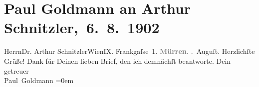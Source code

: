 

         
         \renewcommand{\erwaehntePersonen}{Personen: Paul Goldmann}
         \renewcommand{\erwaehnteOrte}{Orte: Frankgasse 1, Mürren, Wien}
         \renewcommand{\erwaehnteWerke}{}
               \section[ Paul Goldmann an Arthur Schnitzler, 6. 8. 1902]{ Paul Goldmann an Arthur Schnitzler, 6. 8. 1902}\nopagebreak{}\rehead{ }\begin{ledgroupsized}[t]{13cm}\normalsize\beginnumbering \toendnotes[C]{\smallbreak\pagebreak[2]} 
\pstart{}{\pb}Herrn\pend{}\pstart{}Dr. Arthur Schnitzler\pend{}\pstart{}Wien\pend{}\pstart{}IX. Frankgaſse 1.\pend{}{\bigskip}\pstart
           \noindent{}{\pb}\textcolor{gray}{\textbf{Mürren.}}\pend
           . Auguſt.\pend
           \pstart
           Herzlichſte Grüße! Dank für Deinen lieben Brief, den ich demnächſt beantworte.\pend
           \pstart
           Dein {\\[\baselineskip]}getreuer {\\[\baselineskip]}\spacefill\mbox{Paul Goldmann}\pend
           \leftskip=0em{}
         
         \endnumbering{}\end{ledgroupsized}  \newcommand{\dateiname}{L03217}\newcommand{\titel}{Paul Goldmann an Arthur Schnitzler, 6. 8. 1902}\newcommand{\editorInnen}{Martin Anton Müller und Laura Untner}
      